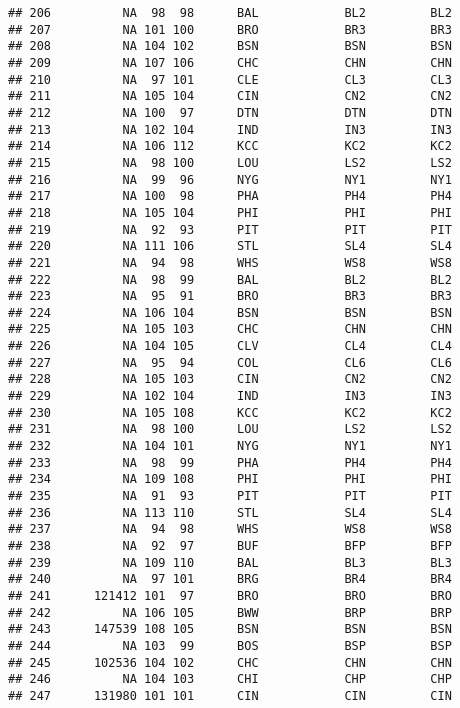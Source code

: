\documentclass[]{article}
\begin{document}
\begin{verbatim}
## 206          NA  98  98      BAL            BL2         BL2
## 207          NA 101 100      BRO            BR3         BR3
## 208          NA 104 102      BSN            BSN         BSN
## 209          NA 107 106      CHC            CHN         CHN
## 210          NA  97 101      CLE            CL3         CL3
## 211          NA 105 104      CIN            CN2         CN2
## 212          NA 100  97      DTN            DTN         DTN
## 213          NA 102 104      IND            IN3         IN3
## 214          NA 106 112      KCC            KC2         KC2
## 215          NA  98 100      LOU            LS2         LS2
## 216          NA  99  96      NYG            NY1         NY1
## 217          NA 100  98      PHA            PH4         PH4
## 218          NA 105 104      PHI            PHI         PHI
## 219          NA  92  93      PIT            PIT         PIT
## 220          NA 111 106      STL            SL4         SL4
## 221          NA  94  98      WHS            WS8         WS8
## 222          NA  98  99      BAL            BL2         BL2
## 223          NA  95  91      BRO            BR3         BR3
## 224          NA 106 104      BSN            BSN         BSN
## 225          NA 105 103      CHC            CHN         CHN
## 226          NA 104 105      CLV            CL4         CL4
## 227          NA  95  94      COL            CL6         CL6
## 228          NA 105 103      CIN            CN2         CN2
## 229          NA 102 104      IND            IN3         IN3
## 230          NA 105 108      KCC            KC2         KC2
## 231          NA  98 100      LOU            LS2         LS2
## 232          NA 104 101      NYG            NY1         NY1
## 233          NA  98  99      PHA            PH4         PH4
## 234          NA 109 108      PHI            PHI         PHI
## 235          NA  91  93      PIT            PIT         PIT
## 236          NA 113 110      STL            SL4         SL4
## 237          NA  94  98      WHS            WS8         WS8
## 238          NA  92  97      BUF            BFP         BFP
## 239          NA 109 110      BAL            BL3         BL3
## 240          NA  97 101      BRG            BR4         BR4
## 241      121412 101  97      BRO            BRO         BRO
## 242          NA 106 105      BWW            BRP         BRP
## 243      147539 108 105      BSN            BSN         BSN
## 244          NA 103  99      BOS            BSP         BSP
## 245      102536 104 102      CHC            CHN         CHN
## 246          NA 104 103      CHI            CHP         CHP
## 247      131980 101 101      CIN            CIN         CIN

\end{verbatim}
\end{document}
